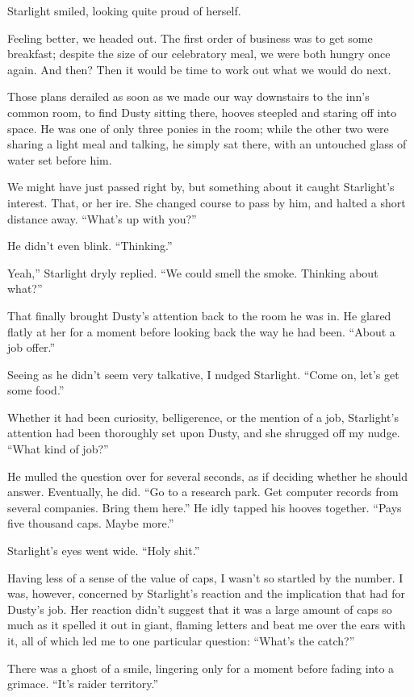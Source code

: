 Starlight smiled, looking quite proud of herself.

Feeling better, we headed out. The first order of business was to get some breakfast; despite the size of our celebratory meal, we were both hungry once again. And then? Then it would be time to work out what we would do next.

Those plans derailed as soon as we made our way downstairs to the inn’s common room, to find Dusty sitting there, hooves steepled and staring off into space. He was one of only three ponies in the room; while the other two were sharing a light meal and talking, he simply sat there, with an untouched glass of water set before him.

We might have just passed right by, but something about it caught Starlight’s interest. That, or her ire. She changed course to pass by him, and halted a short distance away. “What’s up with you?”

He didn’t even blink. “Thinking.”

\leavevmode{}Yeah,” Starlight dryly replied. “We could smell the smoke. Thinking about what?”

That finally brought Dusty’s attention back to the room he was in. He glared flatly at her for a moment before looking back the way he had been. “About a job offer.”

Seeing as he didn’t seem very talkative, I nudged Starlight. “Come on, let’s get some food.”

Whether it had been curiosity, belligerence, or the mention of a job, Starlight’s attention had been thoroughly set upon Dusty, and she shrugged off my nudge. “What kind of job?”

He mulled the question over for several seconds, as if deciding whether he should answer. Eventually, he did. “Go to a research park. Get computer records from several companies. Bring them here.” He idly tapped his hooves together. “Pays five thousand caps. Maybe more.”

Starlight’s eyes went wide. “Holy shit.”

Having less of a sense of the value of caps, I wasn’t so startled by the number. I was, however, concerned by Starlight’s reaction and the implication that had for Dusty’s job. Her reaction didn’t suggest that it was a large amount of caps so much as it spelled it out in giant, flaming letters and beat me over the ears with it, all of which led me to one particular question: “What’s the catch?”

There was a ghost of a smile, lingering only for a moment before fading into a grimace. “It’s raider territory.”


